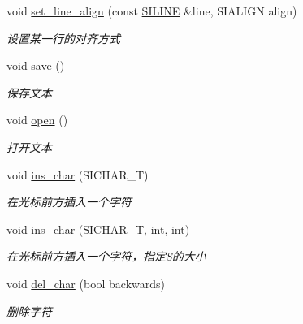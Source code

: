 \begin{DoxyCompactItemize}
void \hyperlink{class_s_i_t_e_x_t_ac0de66d8174d426e6b90641f36c6f74c}{set\+\_\+line\+\_\+align} (const \hyperlink{struct_s_i_r_a_n_g_e}{S\+I\+L\+I\+NE} \&line, S\+I\+A\+L\+I\+GN align)
\begin{DoxyCompactList}\small\item\em 设置某一行的对齐方式 \end{DoxyCompactList}\item 
\mbox{\label{class_s_i_t_e_x_t_a4dd44878d55139898fcead669e074c2e}} 
void \hyperlink{class_s_i_t_e_x_t_a4dd44878d55139898fcead669e074c2e}{save} ()
\begin{DoxyCompactList}\small\item\em 保存文本 \end{DoxyCompactList}\item 
\mbox{\label{class_s_i_t_e_x_t_a270a832a88596618a424d8d9f9d3cb80}} 
void \hyperlink{class_s_i_t_e_x_t_a270a832a88596618a424d8d9f9d3cb80}{open} ()
\begin{DoxyCompactList}\small\item\em 打开文本 \end{DoxyCompactList}\item 
\mbox{\label{class_s_i_t_e_x_t_a6324f46cb5b509caca467ee700305f0c}} 
void \hyperlink{class_s_i_t_e_x_t_a6324f46cb5b509caca467ee700305f0c}{ins\+\_\+char} (S\+I\+C\+H\+A\+R\+\_\+T)
\begin{DoxyCompactList}\small\item\em 在光标前方插入一个字符 \end{DoxyCompactList}\item 
\mbox{\label{class_s_i_t_e_x_t_aad511d1ac1db11e0f7e462e927562c4d}} 
void \hyperlink{class_s_i_t_e_x_t_aad511d1ac1db11e0f7e462e927562c4d}{ins\+\_\+char} (S\+I\+C\+H\+A\+R\+\_\+T, int, int)
\begin{DoxyCompactList}\small\item\em 在光标前方插入一个字符，指定\+S的大小 \end{DoxyCompactList}\item 
void \hyperlink{class_s_i_t_e_x_t_ac7262ab8b1305edc15cc6e4fb783f7d6}{del\+\_\+char} (bool backwards)
\begin{DoxyCompactList}\small\item\em 删除字符~\newline

\end{DoxyCompactList}
\end{DoxyCompactItemize}
